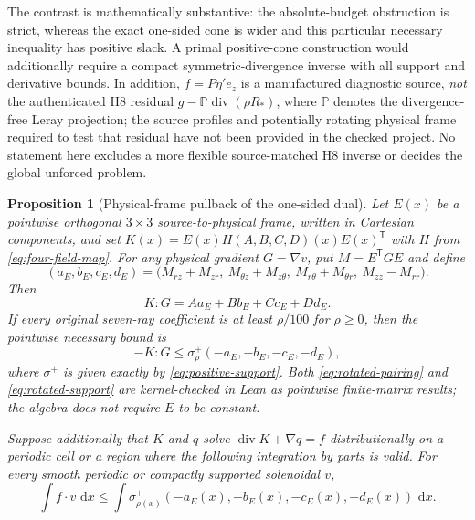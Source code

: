 \documentclass[11pt,a4paper]{article}
\theoremstyle{plain}
\newtheorem{proposition}[theorem]{Proposition}
\theoremstyle{definition}
\newcommand{\diver}{\operatorname{div}}
\newcommand{\dd}{\,\mathrm{d}}
\begin{document}
The contrast is mathematically substantive: the absolute-budget
obstruction is strict, whereas the exact one-sided cone is wider
and this particular necessary inequality has positive slack. A
primal positive-cone construction would additionally require a
compact symmetric-divergence inverse with all support and derivative
bounds. In addition, $f=P\eta'e_z$ is a
manufactured diagnostic source, \emph{not} the authenticated H8
residual $g-\mathbb P\diver(\rho R_*)$, where $\mathbb P$ denotes
the divergence-free Leray projection; the source profiles and
potentially rotating physical frame required to test that residual
have not been provided in the checked project. No statement here
excludes a more flexible source-matched H8 inverse or decides the
global unforced problem.

\begin{proposition}[Physical-frame pullback of the one-sided dual]
\label{prop:rotated-dual}
Let $E(x)$ be a pointwise orthogonal $3\times3$ source-to-physical
frame, written in Cartesian components, and set
$K(x)=E(x)H(A,B,C,D)(x)E(x)^{\mathsf T}$ with
$H$ from \eqref{eq:four-field-map}. For any physical gradient
$G=\nabla v$, put $M=E^{\mathsf T}GE$ and define
\begin{equation}\label{eq:rotated-covector}
 (a_E,b_E,c_E,d_E)
 =\big(M_{rz}+M_{zr},\ M_{\theta z}+M_{z\theta},\
 M_{r\theta}+M_{\theta r},\ M_{zz}-M_{rr}\big).
\end{equation}
Then
\begin{equation}\label{eq:rotated-pairing}
 K:G=Aa_E+Bb_E+Cc_E+Dd_E.
\end{equation}
If every original seven-ray coefficient is at least $\rho/100$
for $\rho\ge0$, then the pointwise necessary bound is
\begin{equation}\label{eq:rotated-support}
 -K:G\le\sigma^+_\rho(-a_E,-b_E,-c_E,-d_E),
\end{equation}
where $\sigma^+$ is given exactly by
\eqref{eq:positive-support}. Both \eqref{eq:rotated-pairing}
and \eqref{eq:rotated-support} are kernel-checked in Lean as
pointwise finite-matrix results; the algebra does not require
$E$ to be constant.

Suppose additionally that $K$ and $q$ solve
$\diver K+\nabla q=f$ distributionally on a periodic cell or
a region where the following integration by parts is valid.
For every smooth periodic or compactly supported solenoidal $v$,
\begin{equation}\label{eq:rotated-integrated}
 \int f\cdot v\,\dd x
 \le\int\sigma^+_{\rho(x)}
       (-a_E(x),-b_E(x),-c_E(x),-d_E(x))\,\dd x.
\end{equation}
\end{proposition}
\end{document}
